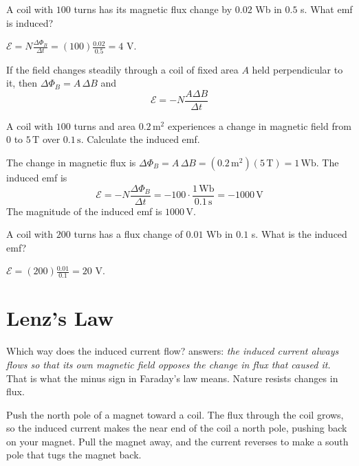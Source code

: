 \begin{Worked}
\begin{Problem}
A coil with $100$ turns has its magnetic flux change
by $0.02$ Wb in $0.5$ s. What emf is induced?
\end{Problem}
\begin{Solution}
$\mathcal{E} = N\frac{\Delta\Phi_B}{\Delta t} = (100)\frac{0.02}{0.5} = 4$ V.
\end{Solution}
\end{Worked}

If the field changes steadily through a coil of fixed area $A$ held
perpendicular to it, then $\Delta\Phi_B = A\,\Delta B$ and
$$\mathcal{E} = -N \frac{A \Delta B }{\Delta t}$$

\begin{Exercise}[title={Induced EMF in a Coil}, label=induced_emf_coil]
A coil with $100$ turns and area $0.2\,\mathrm{m}^2$ experiences a change in magnetic field from $0$ to $5\,\mathrm{T}$ over $0.1\,\mathrm{s}$. Calculate the induced emf.
\end{Exercise}
\begin{Answer}[ref=induced_emf_coil]
The change in magnetic flux is
$\Delta \Phi_B = A\,\Delta B = (0.2\,\mathrm{m}^2)(5\,\mathrm{T}) = 1\,\mathrm{Wb}$.
The induced emf is
\[
\mathcal{E} = -N \frac{\Delta \Phi_B}{\Delta t} = -100 \cdot \frac{1\,\mathrm{Wb}}{0.1\,\mathrm{s}} = -1000\,\mathrm{V}
\]
The magnitude of the induced emf is $1000\,\mathrm{V}$.
\end{Answer}

\begin{Exercise}[title={Twice the Turns}, label=ind2]
A coil with $200$ turns has a flux change of $0.01$ Wb in $0.1$ s. What is the induced emf?
\end{Exercise}
\begin{Answer}[ref=ind2]
$\mathcal{E} = (200)\frac{0.01}{0.1} = 20$ V.
\end{Answer}

\section{Lenz's Law}
Which way does the induced current flow?  answers:
\emph{the induced current always flows so that its own magnetic field
opposes the change in flux that caused it.} That is what the minus sign in
Faraday's law means. Nature resists changes in flux.

Push the north pole of a magnet toward a coil. The flux through the coil
grows, so the induced current makes the near end of the coil a north pole,
pushing back on your magnet. Pull the magnet away, and the current reverses
to make a south pole that tugs the magnet back.

